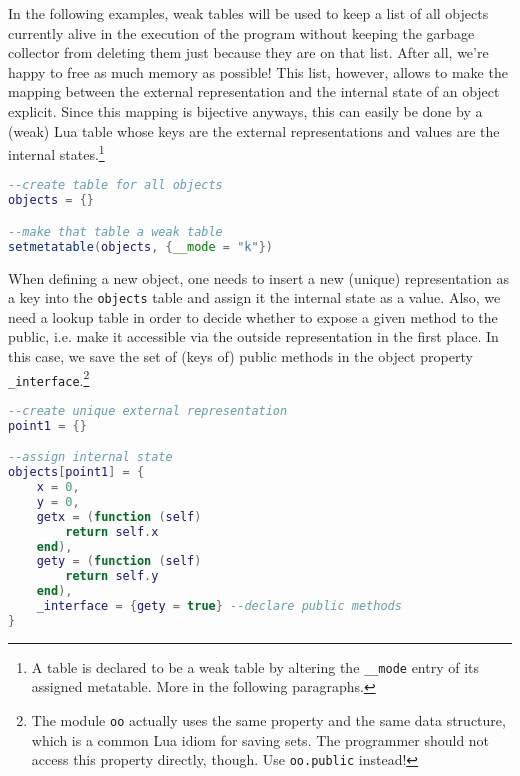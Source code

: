 In the following examples, weak tables will be used to keep a list of all objects currently alive in the execution of the program without keeping the garbage collector from deleting them just because they are on that list. After all, we're happy to free as much memory as possible! This list, however, allows to make the mapping between the external representation and the internal state of an object explicit. Since this mapping is bijective anyways, this can easily be done by a (weak) Lua table whose keys are the external representations and values are the internal states.\footnote{A table is declared to be a weak table by altering the \texttt{\_\_mode} entry of its assigned metatable. More in the following paragraphs.}

\begin{lstlisting}[language=lua, caption={Defining a global weak table in order to list all objects in the progam}, label=lst:tab1, name=lst:tab]
--create table for all objects
objects = {}

--make that table a weak table
setmetatable(objects, {__mode = "k"})
\end{lstlisting}

When defining a new object, one needs to insert a new (unique) representation as a key into the \texttt{objects} table and assign it the internal state as a value. Also, we need a lookup table in order to decide whether to expose a given method to the public, i.e. make it accessible via the outside representation in the first place. In this case, we save the set of (keys of) public methods in the object property \texttt{\_interface}.\footnote{The module \texttt{oo} actually uses the same property and the same data structure, which is a common Lua idiom for saving sets. The programmer should not access this property directly, though. Use \texttt{oo.public} instead!}

\begin{lstlisting}[language=lua, caption={Possible implementation of a point object using a global weak table (continued froom listing \ref{lst:tab1})}, label=lst:tab2, name=lst:tab]
--create unique external representation
point1 = {}

--assign internal state
objects[point1] = {
	x = 0,
	y = 0,
	getx = (function (self)
		return self.x
	end),
	gety = (function (self)
		return self.y
	end),
	_interface = {gety = true} --declare public methods
}
\end{lstlisting}

